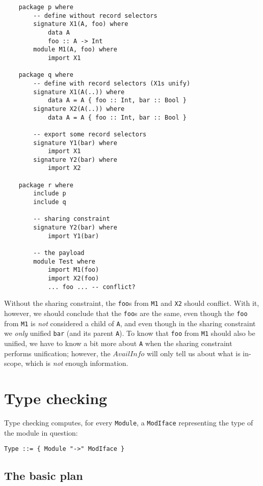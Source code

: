 \documentclass{article}
\begin{document}
\begin{verbatim}
    package p where
        -- define without record selectors
        signature X1(A, foo) where
            data A
            foo :: A -> Int
        module M1(A, foo) where
            import X1

    package q where
        -- define with record selectors (X1s unify)
        signature X1(A(..)) where
            data A = A { foo :: Int, bar :: Bool }
        signature X2(A(..)) where
            data A = A { foo :: Int, bar :: Bool }

        -- export some record selectors
        signature Y1(bar) where
            import X1
        signature Y2(bar) where
            import X2

    package r where
        include p
        include q

        -- sharing constraint
        signature Y2(bar) where
            import Y1(bar)

        -- the payload
        module Test where
            import M1(foo)
            import X2(foo)
            ... foo ... -- conflict?
\end{verbatim}

Without the sharing constraint, the \verb|foo|s from \verb|M1| and \verb|X2|
should conflict.  With it, however, we should conclude that the \verb|foo|s
are the same, even though the \verb|foo| from \verb|M1| is \emph{not}
considered a child of \verb|A|, and even though in the sharing constraint
we \emph{only} unified \verb|bar| (and its parent \verb|A|).  To know that
\verb|foo| from \verb|M1| should also be unified, we have to know a bit
more about \verb|A| when the sharing constraint performs unification;
however, the $AvailInfo$ will only tell us about what is in-scope, which
is \emph{not} enough information.


\section{Type checking}

Type checking computes, for every \verb|Module|, a \verb|ModIface|
representing the type of the module in question:

\begin{verbatim}
Type ::= { Module "->" ModIface }
\end{verbatim}

\subsection{The basic plan}
\end{document}
